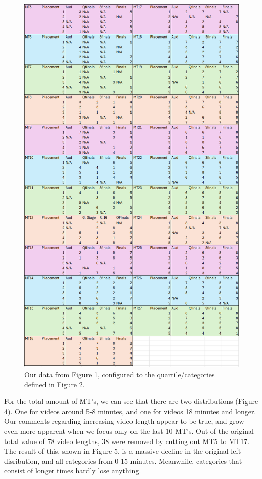 \documentclass[letterpaper,twocolumn,amsmath,amssymb,prl,nolongbibliography,url,reprint]{revtex4-2}
\begin{document}
\begin{figure}
\includegraphics[width=1\linewidth]{Finaldata.png}
\caption{\label{fg:ret}
Our data from Figure 1, configured to the quartile/categories defined in Figure 2.}
\end{figure}

For the total amount of MT's, we can see that there are two distributions (Figure 4). One for videos around 5-8 minutes, and one for videos 18 minutes and longer. Our comments regarding increasing video length appear to be true, and grow even more apparent when we focus only on the last 10 MT's. Out of the original total value of 78 video lengths, 38 were removed by cutting out MT5 to MT17. The result of this, shown in Figure 5, is a massive decline in the original left disribution, and all categories from 0-15 minutes. Meanwhile, categories that consist of longer times hardly lose anything.
\end{document}
